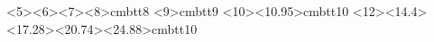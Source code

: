 

\newcommand{\edition}{082902}
\newcommand{\version}{082902}
\newcommand{\gxxversion}{2.95}
\newcommand{\gxxcurrent}{2.95}

\newcommand{\tobewritten}{\vspace{\baselineskip}$<$TO BE WRITTEN$>$\vspace{\baselineskip}}
\newcommand{\tobeextended}{\vspace{\baselineskip}$<$TO BE EXTENDED$>$\vspace{\baselineskip}}


     {<5><6><7><8>cmbtt8%
      <9>cmbtt9%
      <10><10.95>cmbtt10%
      <12><14.4><17.28><20.74><24.88>cmbtt10%
      }{}

\lstset{language=[ANSI]C++}
\lstset{basicstyle=\ttfamily}
\lstset{showstringspaces=false}
\lstset{numbers=none}
\lstset{numberstyle=\tiny}
\lstset{stepnumber=10}
\lstset{captionpos=b}

\makeatletter
\providecommand{\toclevel@lstlisting}{1}
\makeatother

\newcommand{\CPP}{\texttt{C++}}


